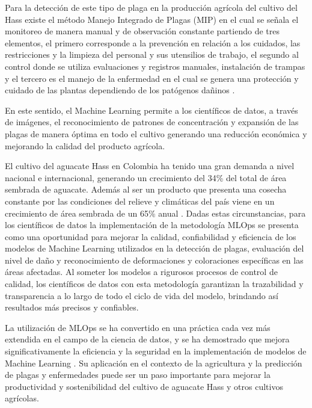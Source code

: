Para la detección de este tipo de plaga en la producción agrícola del cultivo del Hass existe el método Manejo Integrado de Plagas (MIP) en el cual se señala el monitoreo de manera manual y de observación constante partiendo de tres elementos, el primero corresponde a la prevención en relación a los cuidados, las restricciones y la limpieza del personal y sus utensilios de trabajo, el segundo al control donde se utiliza evaluaciones y registros manuales, instalación de trampas y el tercero es el manejo de la enfermedad en el cual se genera una protección y cuidado de las plantas dependiendo de los patógenos dañinos \citep{ica2012manejo}.

En este sentido, el Machine Learning permite a los científicos de datos, a través de imágenes, el reconocimiento de patrones de concentración y expansión de las plagas de manera óptima en todo el cultivo generando una reducción económica y mejorando la calidad del producto agrícola.

El cultivo del aguacate Hass en Colombia ha tenido una gran demanda a nivel nacional e internacional, generando un crecimiento del 34\% del total de área sembrada de aguacate. Además al ser un producto que presenta una cosecha constante por las condiciones del relieve y climáticas del país viene en un crecimiento de área sembrada de un 65\% anual \citep{proyectocolombiamide2021}. Dadas estas circunstancias, para los científicos de datos la implementación de la metodología MLOps se presenta como una oportunidad para mejorar la calidad, confiabilidad y eficiencia de los modelos de Machine Learning utilizados en la detección de plagas, evaluación del nivel de daño y reconocimiento de deformaciones y coloraciones específicas en las áreas afectadas. Al someter los modelos a rigurosos procesos de control de calidad, los científicos de datos con esta metodología garantizan la trazabilidad y transparencia a lo largo de todo el ciclo de vida del modelo, brindando así resultados más precisos y confiables.

\newpage
La utilización de MLOps se ha convertido en una práctica cada vez más extendida en el campo de la ciencia de datos, y se ha demostrado que mejora significativamente la eficiencia y la seguridad en la implementación de modelos de Machine Learning \citep{geron2019hands}. Su aplicación en el contexto de la agricultura y la predicción de plagas y enfermedades puede ser un paso importante para mejorar la productividad y sostenibilidad del cultivo de aguacate Hass y otros cultivos agrícolas.

